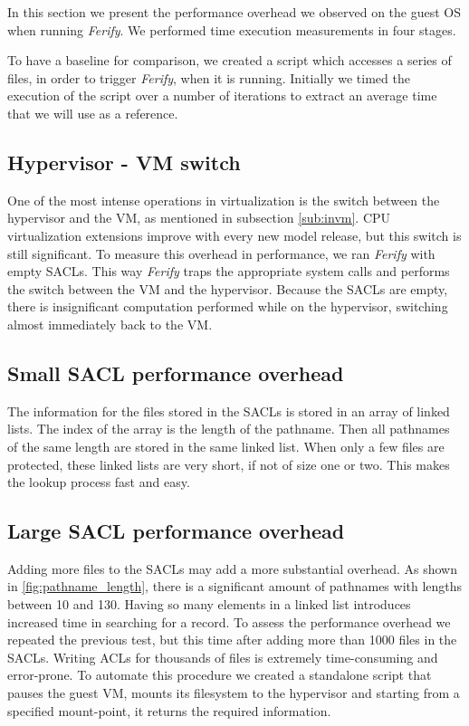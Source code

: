 In this section we present the performance overhead we observed on the guest \ac{OS} when running \emph{Ferify}. We performed time execution measurements in four stages. 

\par To have a baseline for comparison, we created a script which accesses a series of files, in order to trigger \emph{Ferify}, when it is running. Initially we timed the execution of the script over a number of iterations to extract an average time that we will use as a reference.

\subsection{Hypervisor - \ac{VM} switch}

\par One of the most intense operations in virtualization is the switch between the hypervisor and the \ac{VM}, as mentioned in subsection \ref{sub:invm}. \ac{CPU} virtualization extensions improve with every new model release, but this switch is still significant. To measure this overhead in performance, we ran \emph{Ferify} with empty \acp{SACL}. This way \emph{Ferify} traps the appropriate system calls and performs the switch between the \ac{VM} and the hypervisor. Because the \acp{SACL} are empty, there is insignificant computation performed while on the hypervisor, switching almost immediately back to the \ac{VM}. 


\subsection{Small \ac{SACL} performance overhead}

\par The information for the files stored in the \acp{SACL} is stored in an array of linked lists. The index of the array is the length of the pathname. Then all pathnames of the same length are stored in the same linked list. When only a few files are protected, these linked lists are very short, if not of size one or two. This makes the lookup process fast and easy. 

\subsection{Large \ac{SACL} performance overhead}

\par Adding more files to the \acp{SACL} may add a more substantial overhead. As shown in \ref{fig:pathname_length}, there is a significant amount of pathnames with lengths between 10 and 130. Having so many elements in a linked list introduces increased time in searching for a record. To assess the performance overhead we repeated the previous test, but this time after adding more than 1000 files in the \acp{SACL}. Writing \acp{ACL} for thousands of files is extremely time-consuming and error-prone. To automate this procedure we created a standalone script that pauses the guest \ac{VM}, mounts its filesystem to the hypervisor and starting from a specified mount-point, it returns the required information. 

